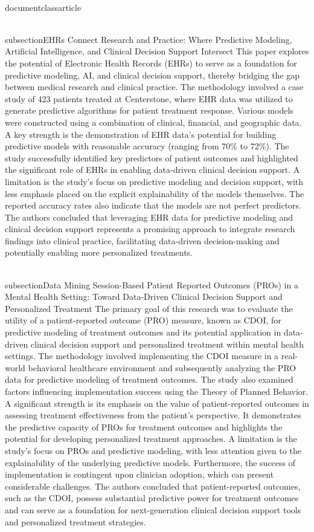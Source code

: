\\documentclass{article}
\begin{document}
\\subsection{EHRs Connect Research and Practice: Where Predictive Modeling, Artificial Intelligence, and Clinical Decision Support Intersect}
This paper explores the potential of Electronic Health Records (EHRs) to serve as a foundation for predictive modeling, AI, and clinical decision support, thereby bridging the gap between medical research and clinical practice. The methodology involved a case study of 423 patients treated at Centerstone, where EHR data was utilized to generate predictive algorithms for patient treatment response. Various models were constructed using a combination of clinical, financial, and geographic data. A key strength is the demonstration of EHR data's potential for building predictive models with reasonable accuracy (ranging from 70\% to 72\%). The study successfully identified key predictors of patient outcomes and highlighted the significant role of EHRs in enabling data-driven clinical decision support. A limitation is the study's focus on predictive modeling and decision support, with less emphasis placed on the explicit explainability of the models themselves. The reported accuracy rates also indicate that the models are not perfect predictors. The authors concluded that leveraging EHR data for predictive modeling and clinical decision support represents a promising approach to integrate research findings into clinical practice, facilitating data-driven decision-making and potentially enabling more personalized treatments.

\\subsection{Data Mining Session-Based Patient Reported Outcomes (PROs) in a Mental Health Setting: Toward Data-Driven Clinical Decision Support and Personalized Treatment}
The primary goal of this research was to evaluate the utility of a patient-reported outcome (PRO) measure, known as CDOI, for predictive modeling of treatment outcomes and its potential application in data-driven clinical decision support and personalized treatment within mental health settings. The methodology involved implementing the CDOI measure in a real-world behavioral healthcare environment and subsequently analyzing the PRO data for predictive modeling of treatment outcomes. The study also examined factors influencing implementation success using the Theory of Planned Behavior. A significant strength is its emphasis on the value of patient-reported outcomes in assessing treatment effectiveness from the patient's perspective. It demonstrates the predictive capacity of PROs for treatment outcomes and highlights the potential for developing personalized treatment approaches. A limitation is the study's focus on PROs and predictive modeling, with less attention given to the explainability of the underlying predictive models. Furthermore, the success of implementation is contingent upon clinician adoption, which can present considerable challenges. The authors concluded that patient-reported outcomes, such as the CDOI, possess substantial predictive power for treatment outcomes and can serve as a foundation for next-generation clinical decision support tools and personalized treatment strategies.
\end{document}
